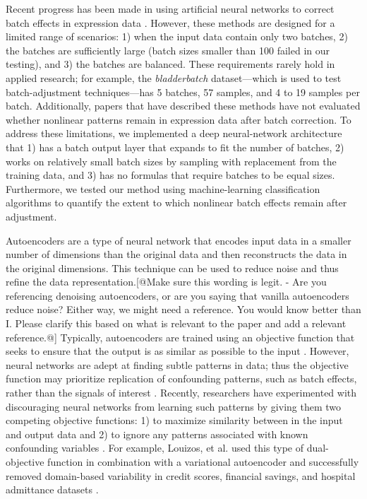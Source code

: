 \documentclass[11pt]{article}
\begin{document}
Recent progress has been made in using artificial neural networks to correct batch effects in expression data \cite{shaham_removal_2017,shaham_batch_2018,upadhyay_removal_2019}.
However, these methods are designed for a limited range of scenarios:
1) when the input data contain only two batches,
2) the batches are sufficiently large (batch sizes smaller than 100 failed in our testing), and
3) the batches are balanced.
These requirements rarely hold in applied research; for example, the \textit{bladderbatch} dataset---which is used to test batch-adjustment techniques\cite{leek_bladderbatch_2017,leek_sva_2017}---has 5 batches, 57 samples, and 4 to 19 samples per batch.
Additionally, papers that have described these methods have not evaluated whether nonlinear patterns remain in expression data after batch correction.
To address these limitations, we implemented a deep neural-network architecture that 1) has a batch output layer that expands to fit
the number of batches, 2) works on relatively small batch sizes by sampling with replacement from the training data, and 3) has
no formulas that require batches to be equal sizes.
Furthermore, we tested our method using machine-learning classification algorithms to quantify the extent to which nonlinear batch effects remain after adjustment.

Autoencoders are a type of neural network that encodes input data in a smaller number of dimensions than the original data and then reconstructs the data in the original dimensions\citep{hinton_reducing_2006}.
This technique can be used to reduce noise and thus refine the data representation.[@Make sure this wording is legit. - Are you referencing denoising autoencoders, or are you saying that vanilla autoencoders reduce noise? Either way, we might need a reference. You would know better than I. Please clarify this based on what is relevant to the paper and add a relevant reference.@]
Typically, autoencoders are trained using an objective function that seeks to ensure that the output is as similar as possible to the input \citep{hinton_reducing_2006}.
However, neural networks are adept at finding subtle patterns in data;
thus the objective function may prioritize replication of confounding patterns, such as batch effects, rather than the signals of interest \citep{ganin_domain-adversarial_2015,louizos_causal_2017-2}.
Recently, researchers have experimented with discouraging neural networks from learning such patterns by giving them two competing objective functions:
1) to maximize similarity between in the input and output data and
2) to ignore any patterns associated with known confounding variables \citep{ganin_domain-adversarial_2015,tzeng_deep_2014-2}.
For example, Louizos, et al. used this type of dual-objective function in combination with a variational autoencoder and successfully removed domain-based variability in credit scores, financial savings, and hospital admittance datasets \citet{louizos_variational_2015}.
\end{document}
